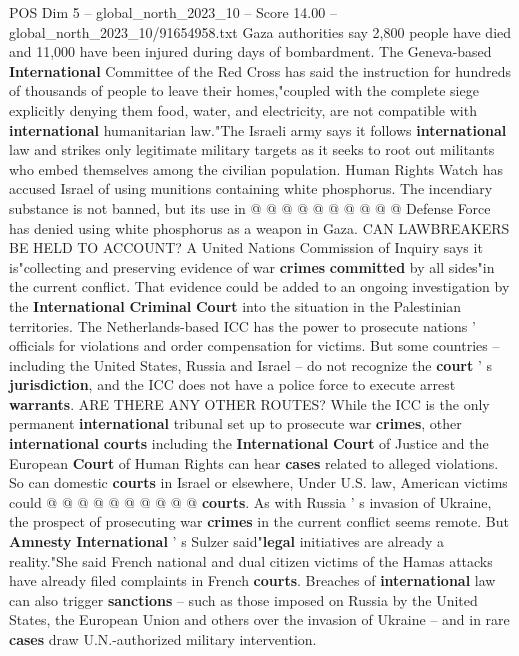 \begin{textsample}{POS Dim 5 – global\_north\_2023\_10 – Score 14.00 – global\_north\_2023\_10/91654958.txt}
Gaza authorities say 2,800 people have died and 11,000 have been injured during days of bombardment.
The Geneva-based \textbf{International} Committee of the Red Cross has said the instruction for hundreds of thousands of people to leave their homes,"coupled with the complete siege explicitly denying them food, water, and electricity, are not compatible with \textbf{international} humanitarian law."The Israeli army says it follows \textbf{international} law and strikes only legitimate military targets as it seeks to root out militants who embed themselves among the civilian population.
Human Rights Watch has accused Israel of using munitions containing white phosphorus.
The incendiary substance is not banned, but its use in @ @ @ @ @ @ @ @ @ @ Defense Force has denied using white phosphorus as a weapon in Gaza.
CAN LAWBREAKERS BE HELD TO ACCOUNT?
A United Nations Commission of Inquiry says it is"collecting and preserving evidence of war \textbf{crimes} \textbf{committed} by all sides"in the current conflict.
That evidence could be added to an ongoing investigation by the \textbf{International} \textbf{Criminal} \textbf{Court} into the situation in the Palestinian territories.
The Netherlands-based ICC has the power to prosecute nations ' officials for violations and order compensation for victims.
But some countries -- including the United States, Russia and Israel -- do not recognize the \textbf{court} ' s \textbf{jurisdiction}, and the ICC does not have a police force to execute arrest \textbf{warrants}.
ARE THERE ANY OTHER ROUTES?
While the ICC is the only permanent \textbf{international} tribunal set up to prosecute war \textbf{crimes}, other \textbf{international} \textbf{courts} including the \textbf{International} \textbf{Court} of Justice and the European \textbf{Court} of Human Rights can hear \textbf{cases} related to alleged violations.
So can domestic \textbf{courts} in Israel or elsewhere, Under U.S. law, American victims could @ @ @ @ @ @ @ @ @ @ \textbf{courts}.
As with Russia ' s invasion of Ukraine, the prospect of prosecuting war \textbf{crimes} in the current conflict seems remote.
But \textbf{Amnesty} \textbf{International} ' s Sulzer said"\textbf{legal} initiatives are already a reality."She said French national and dual citizen victims of the Hamas attacks have already filed complaints in French \textbf{courts}.
Breaches of \textbf{international} law can also trigger \textbf{sanctions} -- such as those imposed on Russia by the United States, the European Union and others over the invasion of Ukraine -- and in rare \textbf{cases} draw U.N.-authorized military intervention.

\end{textsample}
